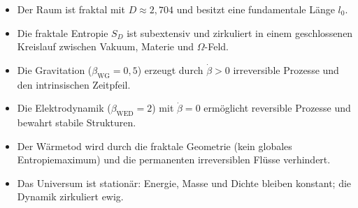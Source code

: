 \begin{itemize}
    \item Der Raum ist fraktal mit \( D \approx 2,704 \) und besitzt eine fundamentale Länge \( l_0 \).
    \item Die fraktale Entropie \( S_D \) ist subextensiv und zirkuliert in einem geschlossenen Kreislauf zwischen Vakuum, Materie und \( \Omega \)-Feld.
    \item Die Gravitation (\( \beta_{\text{WG}} = 0,5 \)) erzeugt durch \( \dot{\beta} > 0 \) irreversible Prozesse und den intrinsischen Zeitpfeil.
    \item Die Elektrodynamik (\( \beta_{\text{WED}} = 2 \)) mit \( \dot{\beta} = 0 \) ermöglicht reversible Prozesse und bewahrt stabile Strukturen.
    \item Der Wärmetod wird durch die fraktale Geometrie (kein globales Entropiemaximum) und die permanenten irreversiblen Flüsse verhindert.
    \item Das Universum ist stationär: Energie, Masse und Dichte bleiben konstant; die Dynamik zirkuliert ewig.
\end{itemize}